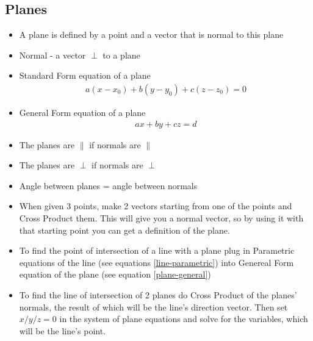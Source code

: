 \documentclass{article}
\begin{document}
\subsection{Planes}
\begin{itemize}
\item A plane is defined by a point and a vector that is normal to this plane
\item Normal - a vector $\perp$ to a plane
\item Standard Form equation of a plane
\begin{align}
  a(x-x_0)+b(y-y_0)+c(z-z_0) = 0
\end{align}
\item General Form equation of a plane
\begin{align}
  ax+by+cz=d \label{plane-general}
\end{align}
\item The planes are $\parallel$ if normals are $\parallel$ 
\item The planes are $\perp$ if normals are $\perp$
\item Angle between planes = angle between normals
\item When given 3 points, make 2 vectors starting from one of the points and Cross Product them. This will give you a normal vector, so by using it with that starting point you can get a definition of the plane.
\item To find the point of intersection of a line with a plane plug in Parametric equations of the line (see equations \ref{line-parametric}) into Genereal Form equation of the plane (see equation \ref{plane-general})
\item To find the line of intersection of 2 planes do Cross Product of the planes' normals, the result of which will be the line's direction vector. Then set $x/y/z = 0$ in the system of plane equations and solve for the variables, which will be the line's point.
\end{itemize}
\end{document}
